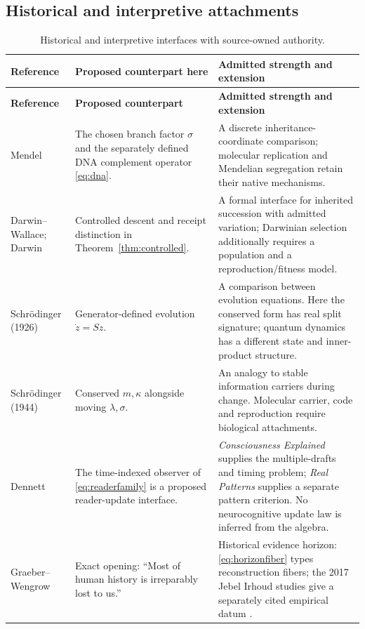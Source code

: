 \documentclass[10pt,letterpaper]{article}
\theoremstyle{definition}\newtheorem{definition}[theorem]{Definition}
\begin{document}
\subsection*{Historical and interpretive attachments}
\small
\begin{longtable}{@{}p{1.22in}p{2.25in}p{2.43in}@{}}
\caption{Historical and interpretive interfaces with source-owned authority.}\label{tab:historyrefs}\\
\toprule
\textbf{Reference}&\textbf{Proposed counterpart here}&\textbf{Admitted strength and extension}\\\midrule\endfirsthead
\toprule\textbf{Reference}&\textbf{Proposed counterpart}&\textbf{Admitted strength and extension}\\\midrule\endhead
Mendel \cite{mendel}& The chosen branch factor $\sigma$ and the separately defined DNA complement operator \eqref{eq:dna}. & A discrete inheritance-coordinate comparison; molecular replication and Mendelian segregation retain their native mechanisms.\\
Darwin--Wallace; Darwin \cite{darwinwallace,darwin}& Controlled descent and receipt distinction in Theorem~\ref{thm:controlled}. & A formal interface for inherited succession with admitted variation; Darwinian selection additionally requires a population and a reproduction/fitness model.\\
Schr\"odinger (1926) \cite{schro26}& Generator-defined evolution $\dot z=Sz$. & A comparison between evolution equations. Here the conserved form has real split signature; quantum dynamics has a different state and inner-product structure.\\
Schr\"odinger (1944) \cite{schro44}& Conserved $m,\kappa$ alongside moving $\lambda,\sigma$. & An analogy to stable information carriers during change. Molecular carrier, code and reproduction require biological attachments.\\
Dennett \cite{dennettCE,dennett91}& The time-indexed observer of \eqref{eq:readerfamily} is a proposed reader-update interface. & \emph{Consciousness Explained} supplies the multiple-drafts and timing problem; \emph{Real Patterns} supplies a separate pattern criterion. No neurocognitive update law is inferred from the algebra.\\
Graeber--Wengrow \cite{graeberwengrow}& Exact opening: ``Most of human history is irreparably lost to us.'' & Historical evidence horizon: \eqref{eq:horizonfiber} types reconstruction fibers; the 2017 Jebel Irhoud studies give a separately cited empirical datum \cite{hublin2017,richter2017}.\\
\bottomrule
\end{longtable}
\normalsize
\end{document}
